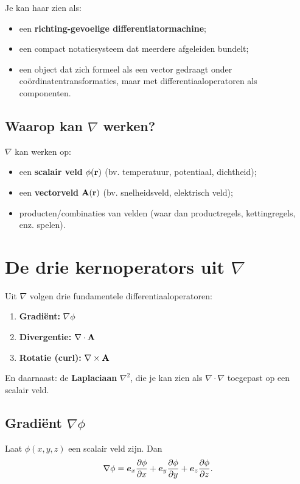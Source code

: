 \documentclass[11pt,a4paper]{article}
\begin{document}
    Je kan haar zien als:
    \begin{itemize}
        \item een \textbf{richting-gevoelige differentiatormachine};
        \item een compact notatiesysteem dat meerdere afgeleiden bundelt;
        \item een object dat zich formeel als een vector gedraagt onder co\"ordinatentransformaties, maar met differentiaaloperatoren als componenten.
    \end{itemize}

    \subsection{Waarop kan \(\nabla\) werken?}
    \(\nabla\) kan werken op:
    \begin{itemize}
        \item een \textbf{scalair veld} \(\phi(\vb{r})\) (bv. temperatuur, potentiaal, dichtheid);
        \item een \textbf{vectorveld} \(\vb{A}(\vb{r})\) (bv. snelheidsveld, elektrisch veld);
        \item producten/combinaties van velden (waar dan productregels, kettingregels, enz. spelen).
    \end{itemize}



    \section{De drie kernoperators uit \texorpdfstring{$\nabla$}{∇}}
    Uit \(\nabla\) volgen drie fundamentele differentiaaloperatoren:
    \begin{enumerate}
        \item \textbf{Gradi\"ent:} \(\nabla \phi\)
        \item \textbf{Divergentie:} \(\nabla\cdot\vb{A}\)
        \item \textbf{Rotatie (curl):} \(\nabla\times\vb{A}\)
    \end{enumerate}
    En daarnaast: de \textbf{Laplaciaan} \(\nabla^2\), die je kan zien als \(\nabla\cdot\nabla\) toegepast op een scalair veld.


    \subsection{Gradi\"ent \texorpdfstring{$\nabla \phi$}{∇φ}}
    Laat \(\phi(x,y,z)\) een scalair veld zijn. Dan
    \begin{equation}
        \nabla \phi =
        \vb*{e}_x \pdv{\phi}{x} + \vb*{e}_y \pdv{\phi}{y} + \vb*{e}_z \pdv{\phi}{z}.
    \end{equation}
\end{document}
